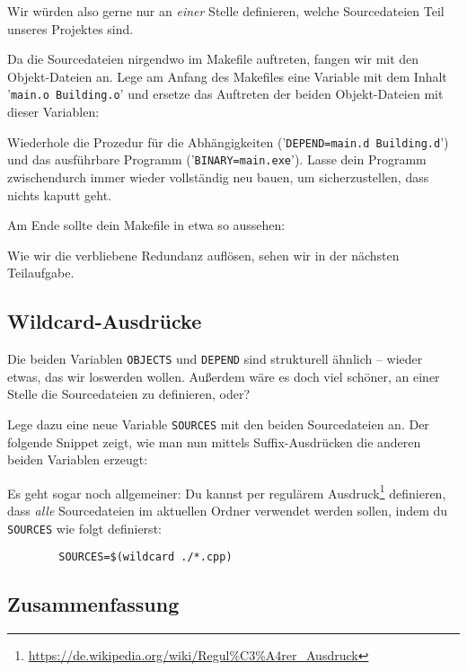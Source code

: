 Wir würden also gerne nur an \emph{einer} Stelle definieren, welche Sourcedateien Teil unseres Projektes sind.

Da die Sourcedateien nirgendwo im Makefile auftreten, fangen wir mit den Objekt-Dateien an.
Lege am Anfang des Makefiles eine Variable mit dem Inhalt '\lstinline{main.o Building.o}' und ersetze das Auftreten der beiden Objekt-Dateien mit dieser Variablen:


Wiederhole die Prozedur für die Abhängigkeiten ('\lstinline{DEPEND=main.d Building.d}') und das ausführbare Programm ('\lstinline{BINARY=main.exe}').
Lasse dein Programm zwischendurch immer wieder vollständig neu bauen, um sicherzustellen, dass nichts kaputt geht.

Am Ende sollte dein Makefile in etwa so aussehen:


Wie wir die verbliebene Redundanz auflösen, sehen wir in der nächsten Teilaufgabe.

\subsection{Wildcard-Ausdrücke}

Die beiden Variablen \lstinline{OBJECTS} und \lstinline{DEPEND} sind strukturell ähnlich -- wieder etwas, das wir loswerden wollen.
Außerdem wäre es doch viel schöner, an einer Stelle die Sourcedateien zu definieren, oder?

Lege dazu eine neue Variable \lstinline{SOURCES} mit den beiden Sourcedateien an.
Der folgende Snippet zeigt, wie man nun mittels Suffix-Ausdrücken die anderen beiden Variablen erzeugt:


Es geht sogar noch allgemeiner:
Du kannst per regulärem Ausdruck\footnote{\url{https://de.wikipedia.org/wiki/Regul\%C3\%A4rer_Ausdruck}} definieren, dass \emph{alle} Sourcedateien im aktuellen Ordner verwendet werden sollen, indem du \lstinline{SOURCES} wie folgt definierst:

\begin{verbatim}
        SOURCES=$(wildcard ./*.cpp)
\end{verbatim}

\subsection{Zusammenfassung}

